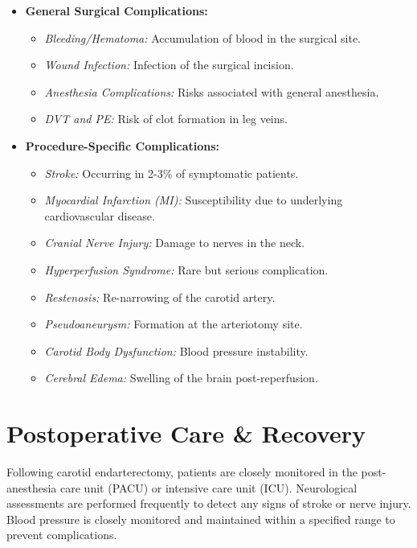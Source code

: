 \begin{itemize}
  \item \textbf{General Surgical Complications:}
    \begin{itemize}
      \item \textit{Bleeding/Hematoma:} Accumulation of blood in the surgical site.
      \item \textit{Wound Infection:} Infection of the surgical incision.
      \item \textit{Anesthesia Complications:} Risks associated with general anesthesia.
      \item \textit{DVT and PE:} Risk of clot formation in leg veins.
    \end{itemize}

  \item \textbf{Procedure-Specific Complications:}
    \begin{itemize}
      \item \textit{Stroke:} Occurring in 2-3\% of symptomatic patients.
      \item \textit{Myocardial Infarction (MI):} Susceptibility due to underlying cardiovascular disease.
      \item \textit{Cranial Nerve Injury:} Damage to nerves in the neck.
      \item \textit{Hyperperfusion Syndrome:} Rare but serious complication.
      \item \textit{Restenosis:} Re-narrowing of the carotid artery.
      \item \textit{Pseudoaneurysm:} Formation at the arteriotomy site.
      \item \textit{Carotid Body Dysfunction:} Blood pressure instability.
      \item \textit{Cerebral Edema:} Swelling of the brain post-reperfusion.
    \end{itemize}
\end{itemize}

\section*{Postoperative Care \& Recovery}
Following carotid endarterectomy, patients are closely monitored in the post-anesthesia care unit (PACU) or intensive care unit (ICU). Neurological assessments are performed frequently to detect any signs of stroke or nerve injury. Blood pressure is closely monitored and maintained within a specified range to prevent complications.

